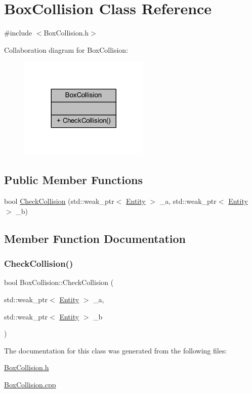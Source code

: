 \hypertarget{class_box_collision}{}\section{Box\+Collision Class Reference}
\label{class_box_collision}


{\ttfamily \#include $<$Box\+Collision.\+h$>$}



Collaboration diagram for Box\+Collision\+:
\nopagebreak
\begin{figure}[H]
\begin{center}
\leavevmode
\includegraphics[width=176pt]{class_box_collision__coll__graph}
\end{center}
\end{figure}
\subsection*{Public Member Functions}
\begin{DoxyCompactItemize}
\item 
bool \mbox{\hyperlink{class_box_collision_a2cdd4303a969f89a37054bdc881ad095}{Check\+Collision}} (std\+::weak\+\_\+ptr$<$ \mbox{\hyperlink{class_entity}{Entity}} $>$ \+\_\+a, std\+::weak\+\_\+ptr$<$ \mbox{\hyperlink{class_entity}{Entity}} $>$ \+\_\+b)
\end{DoxyCompactItemize}


\subsection{Member Function Documentation}
\mbox{\label{class_box_collision_a2cdd4303a969f89a37054bdc881ad095}} 
\subsubsection{\texorpdfstring{Check\+Collision()}{CheckCollision()}}
{\footnotesize\ttfamily bool Box\+Collision\+::\+Check\+Collision (\begin{DoxyParamCaption}\item[{std\+::weak\+\_\+ptr$<$ \mbox{\hyperlink{class_entity}{Entity}} $>$}]{\+\_\+a,  }\item[{std\+::weak\+\_\+ptr$<$ \mbox{\hyperlink{class_entity}{Entity}} $>$}]{\+\_\+b }\end{DoxyParamCaption})}



The documentation for this class was generated from the following files\+:\begin{DoxyCompactItemize}
\item 
\mbox{\hyperlink{_box_collision_8h}{Box\+Collision.\+h}}\item 
\mbox{\hyperlink{_box_collision_8cpp}{Box\+Collision.\+cpp}}\end{DoxyCompactItemize}
